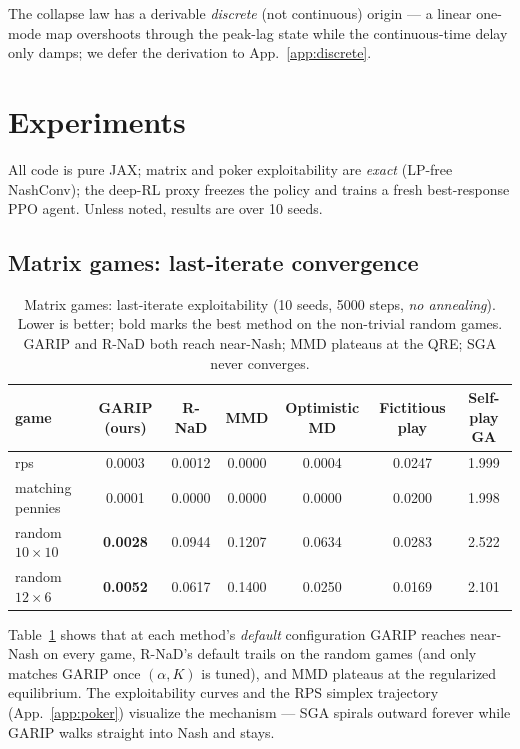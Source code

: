 \documentclass[10pt,twocolumn]{article}
\theoremstyle{plain}
\theoremstyle{remark}
\begin{document}
\noindent The collapse law has a derivable \emph{discrete} (not continuous) origin --- a
linear one-mode map overshoots through the peak-lag state while the continuous-time
delay only damps; we defer the derivation to App.~\ref{app:discrete}.

\section{Experiments}
\label{sec:exp}

All code is pure JAX; matrix and poker exploitability are \emph{exact}
(LP-free NashConv); the deep-RL proxy freezes the policy and trains a fresh
best-response PPO agent. Unless noted, results are over 10 seeds.

\subsection{Matrix games: last-iterate convergence}

\begin{table}[tp]
\centering
\caption{Matrix games: last-iterate exploitability (10 seeds, 5000 steps,
\emph{no annealing}). Lower is better; bold marks the best method on the
non-trivial random games. GARIP and R-NaD both reach near-Nash; MMD plateaus at
the QRE; SGA never converges.}
\label{tab:matrix}
\begin{tabular}{lcccccc}
\toprule
game & GARIP (ours) & R-NaD & MMD & Optimistic MD & Fictitious play & Self-play GA \\
\midrule
rps                 & 0.0003 & 0.0012 & 0.0000 & 0.0004 & 0.0247 & 1.999 \\
matching pennies    & 0.0001 & 0.0000 & 0.0000 & 0.0000 & 0.0200 & 1.998 \\
random $10\times10$ & \textbf{0.0028} & 0.0944 & 0.1207 & 0.0634 & 0.0283 & 2.522 \\
random $12\times6$  & \textbf{0.0052} & 0.0617 & 0.1400 & 0.0250 & 0.0169 & 2.101 \\
\bottomrule
\end{tabular}
\end{table}

Table~\ref{tab:matrix} shows that at each method's \emph{default} configuration
GARIP reaches near-Nash on every game, R-NaD's default trails on the random
games (and only matches GARIP once $(\alpha,K)$ is tuned), and MMD plateaus at
the regularized equilibrium. The exploitability curves and the RPS simplex
trajectory (App.~\ref{app:poker}) visualize the mechanism --- SGA spirals outward
forever while GARIP walks straight into Nash and stays.
\end{document}
